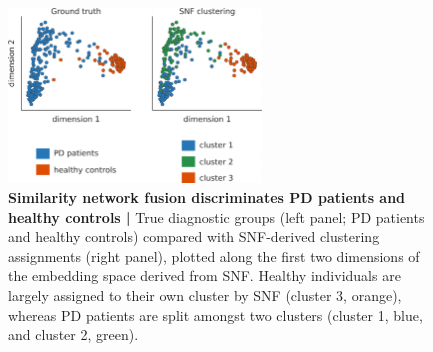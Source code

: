 \documentclass[12pt,aps,pra,reprint,showkeys]{revtex4-1}
\begin{document}
\clearpage

\begin{figure}[p]
  \begin{center}
    \centerline{\includegraphics[width=0.6\textwidth]{pdhc_clustering.pdf}}
    \caption{
      \textbf{Similarity network fusion discriminates PD patients and healthy controls |}
      True diagnostic groups (left panel; PD patients and healthy controls) compared with SNF-derived clustering assignments (right panel), plotted along the first two dimensions of the embedding space derived from SNF.
      Healthy individuals are largely assigned to their own cluster by SNF (cluster 3, orange), whereas PD patients are split amongst two clusters (cluster 1, blue, and cluster 2, green).
    }
    \label{supp-figure-pdhc-clusters}
  \end{center}
\end{figure}
\end{document}
